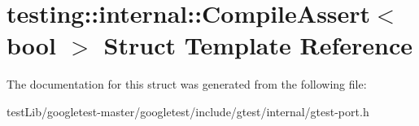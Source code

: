 \hypertarget{structtesting_1_1internal_1_1CompileAssert}{}\section{testing\+:\+:internal\+:\+:Compile\+Assert$<$ bool $>$ Struct Template Reference}
\label{structtesting_1_1internal_1_1CompileAssert}


The documentation for this struct was generated from the following file\+:\begin{DoxyCompactItemize}
\item 
test\+Lib/googletest-\/master/googletest/include/gtest/internal/gtest-\/port.\+h\end{DoxyCompactItemize}

